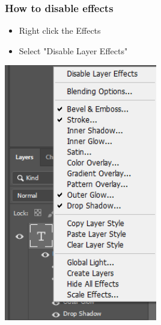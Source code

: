 \documentclass{beamer}
\begin{document}
	\begin{frame}
	\frametitle{How to disable effects}
	\begin{itemize}
		\item Right click the Effects
		\item Select "Disable Layer Effects"
	\end{itemize}
	\begin{center}
		\includegraphics[width = 0.5\textwidth]{images/disable effects.png}
	\end{center}
\end{frame}
\end{document}
